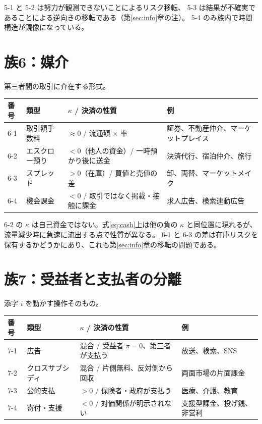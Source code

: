 5-1 と 5-2 は努力が観測できないことによるリスク移転、
5-3 は結果が不確実であることによる逆向きの移転である（第\ref{sec:info}章の注）。
5-4 のみ族内で時間構造が鏡像になっている。

\section{族6：媒介}

第三者間の取引に介在する形式。

\begin{center}
\begin{tabularx}{\textwidth}{@{}llXX@{}}
\toprule
番号 & 類型 & $\kappa$ / 決済の性質 & 例 \\
\midrule
6-1 & 取引額手数料 & $\approx 0$ / 流通額 $\times$ 率 & 証券、不動産仲介、マーケットプレイス \\
6-2 & エスクロー預り & $<0$（他人の資金）/ 一時預かり後に送金 & 決済代行、宿泊仲介、旅行 \\
6-3 & スプレッド & $>0$（在庫）/ 買値と売値の差 & 卸、両替、マーケットメイク \\
6-4 & 機会課金 & $<0$ / 取引ではなく掲載・接触に課金 & 求人広告、検索連動広告 \\
\bottomrule
\end{tabularx}
\label{tab:family-6-catalog}
\end{center}

6-2 の $\kappa$ は自己資金ではない。式\eqref{eq:cash}上は他の負の $\kappa$ と同位置に現れるが、
流量減少時に急速に流出する点で性質が異なる。
6-1 と 6-3 の差は在庫リスクを保有するかどうかにあり、これも第\ref{sec:info}章の移転の問題である。

\section{族7：受益者と支払者の分離}

添字 $i$ を動かす操作そのもの。

\begin{center}
\begin{tabularx}{\textwidth}{@{}llXX@{}}
\toprule
番号 & 類型 & $\kappa$ / 決済の性質 & 例 \\
\midrule
7-1 & 広告 & 混合 / 受益者 $\pi=0$、第三者が支払う & 放送、検索、SNS \\
7-2 & クロスサブシディ & 混合 / 片側無料、反対側から回収 & 両面市場の片面課金 \\
7-3 & 公的支払 & $>0$ / 保険者・政府が支払う & 医療、介護、教育 \\
7-4 & 寄付・支援 & $<0$ / 対価関係が明示されない & 支援型課金、投げ銭、非営利 \\
\bottomrule
\end{tabularx}
\label{tab:family-7-catalog}
\end{center}

